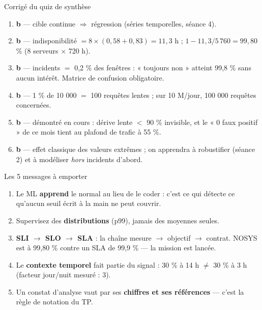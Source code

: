 \begin{frame}{Corrigé du quiz de synthèse}
\begin{solbox}
\begin{enumerate}
\item \textbf{b} --- cible continue $\Rightarrow$ régression (séries temporelles, séance 4).
\item \textbf{b} --- indisponibilité $= 8 \times (0{,}58+0{,}83) = 11{,}3$ h ;
$1 - 11{,}3 / 5\,760 = 99{,}80$ \% (8 serveurs $\times$ 720 h).
\item \textbf{b} --- incidents $=$ 0,2 \% des fenêtres : « toujours non » atteint
99,8 \% sans aucun intérêt. Matrice de confusion obligatoire.
\item \textbf{b} --- 1 \% de 10 000 $=$ 100 requêtes lentes ; sur 10 M/jour,
100 000 requêtes concernées.
\item \textbf{b} --- démontré en cours : dérive lente $<$ 90 \% invisible,
et le « 0 faux positif » de ce mois tient au plafond de trafic à 55 \%.
\item \textbf{b} --- effet classique des valeurs extrêmes ; on apprendra à
robustifier (séance 2) et à modéliser \emph{hors} incidents d'abord.
\end{enumerate}
\end{solbox}
\end{frame}

\begin{frame}{Les 5 messages à emporter}
\begin{kbox}
\begin{enumerate}
\item Le ML \textbf{apprend} le normal au lieu de le coder : c'est ce qui
détecte ce qu'aucun seuil écrit à la main ne peut couvrir.
\item Supervisez des \textbf{distributions} (p99), jamais des moyennes seules.
\item \textbf{SLI $\to$ SLO $\to$ SLA} : la chaîne mesure $\to$ objectif $\to$ contrat.
NOSYS est à 99,80 \% contre un SLA de 99,9 \% --- la mission est lancée.
\item Le \textbf{contexte temporel} fait partie du signal : 30 \% à 14 h $\ne$
30 \% à 3 h (facteur jour/nuit mesuré : 3).
\item Un constat d'analyse vaut par ses \textbf{chiffres et ses références} ---
c'est la règle de notation du TP.
\end{enumerate}
\end{kbox}
\end{frame}


